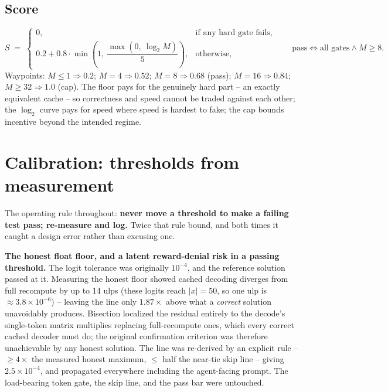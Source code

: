 \documentclass[11pt]{article}
\begin{document}
\subsection{Score}

\[
S \;=\;
\begin{cases}
0, & \text{if any hard gate fails,}\\[6pt]
0.2 + 0.8\cdot\min\!\left(1,\ \dfrac{\max(0,\ \log_2 M)}{5}\right), & \text{otherwise,}
\end{cases}
\qquad
\text{pass} \iff \text{all gates} \wedge M \geq 8 .
\]
Waypoints: $M \leq 1 \Rightarrow 0.2$; $M = 4 \Rightarrow 0.52$; $M = 8 \Rightarrow
0.68$ (pass); $M = 16 \Rightarrow 0.84$; $M \geq 32 \Rightarrow 1.0$ (cap). The floor
pays for the genuinely hard part -- an exactly equivalent cache -- so correctness and
speed cannot be traded against each other; the $\log_2$ curve pays for speed where
speed is hardest to fake; the cap bounds incentive beyond the intended regime.

\section{Calibration: thresholds from measurement}
\label{sec:calibration}

The operating rule throughout: \textbf{never move a threshold to make a failing test
pass; re-measure and log.} Twice that rule bound, and both times it caught a design
error rather than excusing one.

\textbf{The honest float floor, and a latent reward-denial risk in a passing
threshold.} The logit tolerance was originally $10^{-4}$, and the reference solution
passed at it. Measuring the honest floor showed cached decoding diverges from full
recompute by up to 14 ulps (these logits reach $|x| = 50$, so one ulp is $\approx
3.8\times 10^{-6}$) -- leaving the line only $1.87\times$ above what a \emph{correct}
solution unavoidably produces. Bisection localized the residual entirely to the
decode's single-token matrix multiplies replacing full-recompute ones, which every
correct cached decoder must do; the original confirmation criterion was therefore
unachievable by any honest solution. The line was re-derived by an explicit rule --
$\geq 4\times$ the measured honest maximum, $\leq$ half the near-tie skip line --
giving $2.5\times 10^{-4}$, and propagated everywhere including the agent-facing
prompt. The load-bearing token gate, the skip line, and the pass bar were untouched.
\end{document}
